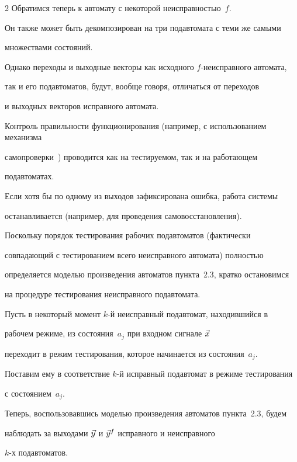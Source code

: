 \begin{multicols}{2}
Обратимся теперь к автомату с некоторой неисправностью~$f$.


Он также может быть декомпозирован на три подавтомата с теми же самыми


множествами состояний.


Однако переходы и выходные векторы как исходного $f$-неисправного автомата,


так и его подавтоматов, будут, вообще говоря, отличаться от переходов


и выходных векторов исправного автомата.





Контроль правильности функционирования (например, с использованием механизма


самопроверки~\cite{1}) проводится как на тестируемом, так и на работающем


подавтоматах.


Если хотя бы по одному из выходов зафиксирована ошибка, работа системы


останавливается (например, для проведения самовосстановления).





Поскольку порядок тестирования рабочих под\-ав\-то\-ма\-тов (фактически


совпадающий с тестированием всего неисправного автомата) пол\-ностью


определяется моделью произведения автоматов пункта~2.3, кратко остановимся


на процедуре тес\-ти\-ро\-ва\-ния неисправного подавтомата.





Пусть в некоторый момент $k$-й неисправный подавтомат, находившийся в


рабочем режиме, из со\-сто\-яния~$a_j$ при входном сигнале $\vec x$


переходит в режим тестирования, которое начинается из со\-сто\-яния~$a_j$.


Поставим ему в соответствие $k$-й исправный подавтомат в режиме тестирования


с со\-сто\-янием~$a_j$.


Теперь, воспользовавшись моделью произведения автоматов пункта~2.3, будем


наблюдать за выходами $\vec y$ и $\vec y^f$ исправного и неисправного


$k$-х подавтоматов.



\end{multicols}
